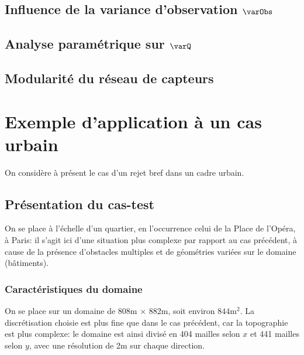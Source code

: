 

\subsection{Influence de la variance d'observation $\varObs$}

\subsection{Analyse paramétrique sur $\varQ$}

\subsection{Modularité du réseau de capteurs}

\section{Exemple d'application à un cas urbain}

On considère à présent le cas d'un rejet bref dans un cadre urbain.\\

\subsection{Présentation du cas-test}

On se place à l'échelle d'un quartier, en l'occurrence celui de la Place de l'Opéra, à Paris: il s'agit ici d'une situation plus complexe par rapport au cas précédent, à cause de la présence d'obstacles multiples et de géométries variées sur le domaine (bâtiments). \\


\subsubsection{Caractéristiques du domaine}

On se place sur un domaine de 808m $\times$ 882m, soit environ $844\text{m}^2$. La discrétisation choisie est plus fine que dans le cas précédent, car la topographie est plus complexe: le domaine est ainsi divisé en 404 mailles selon $x$ et 441 mailles selon $y$, avec une résolution de 2m sur chaque direction. \\


